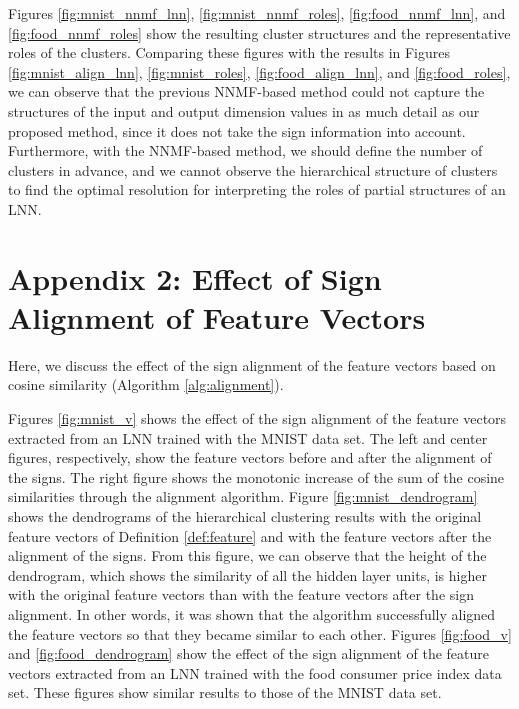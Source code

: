 \documentclass{article}
\begin{document}
Figures \ref{fig:mnist_nnmf_lnn}, \ref{fig:mnist_nnmf_roles}, \ref{fig:food_nnmf_lnn}, and \ref{fig:food_nnmf_roles} show the resulting cluster structures and the representative roles of the clusters. Comparing these figures with the results in Figures \ref{fig:mnist_align_lnn}, \ref{fig:mnist_roles}, \ref{fig:food_align_lnn}, and \ref{fig:food_roles}, we can observe that the previous NNMF-based method could not capture the structures of the input and output dimension values in as much detail as our proposed method, since it does not take the sign information into account. 
Furthermore, with the NNMF-based method, we should define the number of clusters in advance, and we cannot observe the hierarchical structure of clusters to find the optimal resolution for interpreting the roles of partial structures of an LNN. 


\section*{Appendix 2: Effect of Sign Alignment of Feature Vectors}

Here, we discuss the effect of the sign alignment of the feature vectors based on cosine similarity (Algorithm \ref{alg:alignment}). 

Figures \ref{fig:mnist_v} shows the effect of the sign alignment of the feature vectors extracted from an LNN trained with the MNIST data set\cite{LeCun1998}. The left and center figures, respectively, show the feature vectors before and after the alignment of the signs. The right figure shows the monotonic increase of the sum of the cosine similarities through the alignment algorithm. Figure \ref{fig:mnist_dendrogram} shows the dendrograms of the hierarchical clustering results with the original feature vectors of Definition \ref{def:feature} and with the feature vectors after the alignment of the signs. From this figure, we can observe that the height of the dendrogram, which shows the similarity of all the hidden layer units, is higher with the original feature vectors than with the feature vectors after the sign alignment. In other words, it was shown that the algorithm successfully aligned the feature vectors so that they became similar to each other. 
Figures \ref{fig:food_v} and \ref{fig:food_dendrogram} show the effect of the sign alignment of the feature vectors extracted from an LNN trained with the food consumer price index data set\cite{estat}. These figures show similar results to those of the MNIST data set. 
\end{document}
